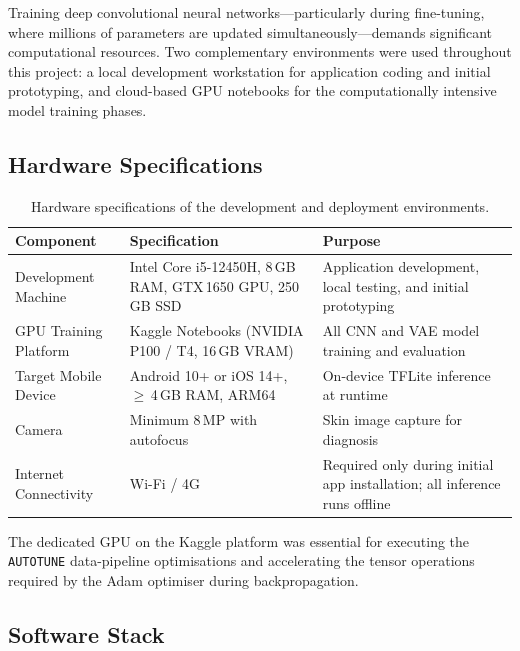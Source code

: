 Training deep convolutional neural networks---particularly during fine-tuning, where millions of parameters are updated simultaneously---demands significant computational resources. Two complementary environments were used throughout this project: a local development workstation for application coding and initial prototyping, and cloud-based GPU notebooks for the computationally intensive model training phases.

\subsection{Hardware Specifications}

\begin{table}[H]
\centering
\caption{Hardware specifications of the development and deployment environments.}
\label{tab:hardware_specs}
\begin{tabular}{|p{3.8cm}|p{5.8cm}|p{5cm}|}
\hline
\textbf{Component} & \textbf{Specification} & \textbf{Purpose} \\ \hline
Development Machine & Intel Core i5-12450H, 8\,GB RAM, GTX\,1650 GPU, 250\,GB SSD & Application development, local testing, and initial prototyping \\ \hline
GPU Training Platform & Kaggle Notebooks (NVIDIA P100 / T4, 16\,GB VRAM) & All CNN and VAE model training and evaluation \\ \hline
Target Mobile Device & Android 10+ or iOS 14+, $\geq$\,4\,GB RAM, ARM64 & On-device TFLite inference at runtime \\ \hline
Camera & Minimum 8\,MP with autofocus & Skin image capture for diagnosis \\ \hline
Internet Connectivity & Wi-Fi / 4G & Required only during initial app installation; all inference runs offline \\ \hline
\end{tabular}
\end{table}

The dedicated GPU on the Kaggle platform was essential for executing the \texttt{AUTOTUNE} data-pipeline optimisations and accelerating the tensor operations required by the Adam optimiser during backpropagation.

\subsection{Software Stack}

